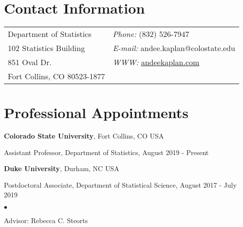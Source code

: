 \documentclass[margin,line]{res}
\newenvironment{list1}{
  \begin{list}{\ding{113}}{%
      \setlength{\itemsep}{0in}
      \setlength{\parsep}{0in} \setlength{\parskip}{0in}
      \setlength{\topsep}{0in} \setlength{\partopsep}{0in}
      \setlength{\leftmargin}{0.17in}}}{\end{list}}
\newenvironment{list2}{
  \begin{list}{$\bullet$}{%
      \setlength{\itemsep}{0in}
      \setlength{\parsep}{0in} \setlength{\parskip}{0in}
      \setlength{\topsep}{0in} \setlength{\partopsep}{0in}
      \setlength{\leftmargin}{0.2in}}}{\end{list}}
\begin{document}
\nocite{*}

\begin{resume}

\section{\sc Contact Information}
\vspace{.05in}
\begin{tabular}{@{}p{2in}p{4in}}
Department of Statistics  & {\it Phone:}  (832) 526-7947 \\
102 Statistics Building &  {\it E-mail:} andee.kaplan@colostate.edu\\
851 Oval Dr. & {\it WWW:} \url{andeekaplan.com} \\
Fort Collins, CO 80523-1877 & \\
\end{tabular}

\section{\sc Professional Appointments}
{\bf Colorado State University}, Fort Collins, CO USA\\
\vspace*{-.1in}
\begin{list1}
\item[] Assistant Professor, Department of Statistics, August 2019 - Present
\end{list1}

{\bf Duke University}, Durham, NC USA\\
\vspace*{-.1in}
\begin{list1}
\item[] Postdoctoral Associate, Department of Statistical Science, August 2017 - July 2019
\begin{list2}
\vspace*{.05in}
\item[] Advisor: Rebecca C. Steorts
\end{list2}
\end{list1}


\end{resume}
\end{document}

